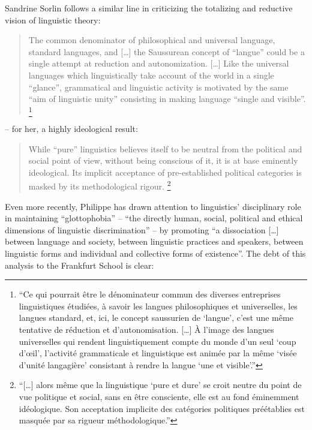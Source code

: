 \documentclass[output=paper]{langscibook}
\begin{document}
Sandrine Sorlin follows a similar line in criticizing the totalizing and reductive vision of linguistic theory:

\begin{quotation}
The common denominator of philosophical and universal language, standard languages, and […] the Saussurean concept of ``langue'' could be a single attempt at reduction and autonomization. […] Like the universal languages which linguistically take account of the world in a single ``glance'', grammatical and linguistic activity is motivated by the same ``aim of linguistic unity'' consisting in making language ``single and visible''. \citep[103]{Sorlin2012}\footnote{``Ce qui pourrait être le dénominateur commun des diverses entreprises linguistiques étudiées, à savoir les langues philosophiques et universelles, les langues standard, et, ici, le concept saussurien de `langue', c'est une même tentative de réduction et d'autonomisation. […] À l’image des langues universelles qui rendent linguistiquement compte du monde d’un seul `coup d’œil', l’activité grammaticale et linguistique est animée par la même `visée d’unité langagière' consistant à rendre la langue `une et visible'.''}
\end{quotation}

– for her, a highly ideological result:

\begin{quotation}
While ``pure'' linguistics believes itself to be neutral from the political and social point of view, without being conscious of it, it is at base eminently ideological. Its implicit acceptance of pre-established political categories is masked by its methodological rigour. \citep[113]{Sorlin2012}\footnote{``[…] alors même que la linguistique `pure et dure' se croit neutre du point de vue politique et social, sans en être consciente, elle est au fond éminemment idéologique. Son acceptation implicite des catégories politiques préétablies est masquée par sa rigueur méthodologique.''}
\end{quotation}

Even more recently, Philippe \citet[73]{Blanchet2016} has drawn attention to linguistics' disciplinary role in maintaining ``glottophobia'' – ``the directly human, social, political and ethical dimensions of linguistic discrimination'' – by promoting ``a dissociation […] between language and society, between linguistic practices and speakers, between linguistic forms and individual and collective forms of existence''. The debt of this analysis to the Frankfurt School is clear:
\end{document}
